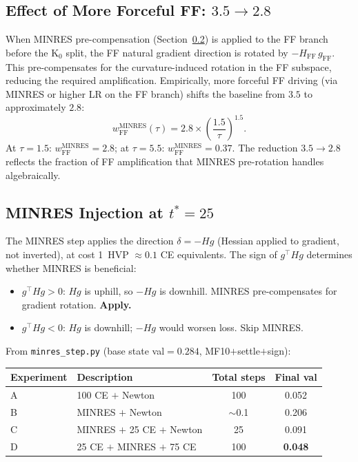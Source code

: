 \documentclass[11pt]{amsart}
\begin{document}
\subsection{Effect of More Forceful FF: \texorpdfstring{$3.5 \to 2.8$}{3.5 -> 2.8}}

When MINRES pre-compensation (Section~\ref{sec:minres}) is applied to
the FF branch before the K$_0$ split, the FF natural gradient direction
is rotated by $-H_\mathrm{FF}\,g_\mathrm{FF}$.
This pre-compensates for the curvature-induced rotation in the FF subspace,
reducing the required amplification.
Empirically, more forceful FF driving (via MINRES or higher LR on the FF branch)
shifts the baseline from $3.5$ to approximately $2.8$:
\begin{equation}
\label{eq:wff_minres}
  w_\mathrm{FF}^\mathrm{MINRES}(\tau)
    = 2.8 \times \left(\frac{1.5}{\tau}\right)^{1.5}.
\end{equation}
At $\tau=1.5$: $w_\mathrm{FF}^\mathrm{MINRES} = 2.8$;
at $\tau=5.5$: $w_\mathrm{FF}^\mathrm{MINRES} = 0.37$.
The reduction $3.5 \to 2.8$ reflects the fraction of FF amplification
that MINRES pre-rotation handles algebraically.

\subsection{MINRES Injection at \texorpdfstring{$t^* = 25$}{t* = 25}}
\label{sec:minres}

The MINRES step applies the direction $\delta = -Hg$
(Hessian applied to gradient, not inverted),
at cost 1~HVP $\approx 0.1$ CE equivalents.
The sign of $g^\top Hg$ determines whether MINRES is beneficial:
\begin{itemize}
\item $g^\top Hg > 0$: $Hg$ is uphill, so $-Hg$ is downhill.
  MINRES pre-compensates for gradient rotation. \textbf{Apply.}
\item $g^\top Hg < 0$: $Hg$ is downhill; $-Hg$ would worsen loss.
  Skip MINRES.
\end{itemize}

From \texttt{minres\_step.py} (base state val$=0.284$, MF10$+$settle$+$sign):
\begin{center}
\small
\begin{tabular}{llcc}
\toprule
Experiment & Description & Total steps & Final val \\
\midrule
A & 100 CE $+$ Newton & 100 & 0.052 \\
B & MINRES $+$ Newton & $\sim$0.1 & 0.206 \\
C & MINRES $+$ 25 CE $+$ Newton & 25 & 0.091 \\
D & 25 CE $+$ MINRES $+$ 75 CE & 100 & \textbf{0.048} \\
\bottomrule
\end{tabular}
\end{center}
\end{document}
